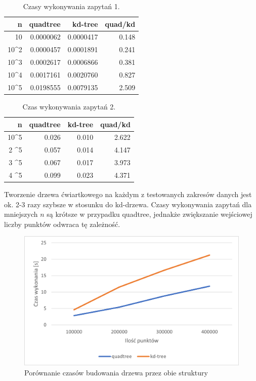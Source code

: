 \documentclass{article}
\begin{document}
\begin{table}[H]
    \centering
    \begin{tabular}{r|rrr}
        n & quadtree & kd-tree & quad/kd \\ \hline
        10 & 0.0000062 & 0.0000417 & 0.148 \\
        10^2 & 0.0000457 & 0.0001891 & 0.241 \\
        10^3 & 0.0002617 & 0.0006866 & 0.381 \\
        10^4 & 0.0017161 & 0.0020760 & 0.827 \\
        10^5 & 0.0198555 & 0.0079135 & 2.509 \\
    \end{tabular}
    \caption{Czasy wykonywania zapytań 1.}
    \label{tab:query1}
\end{table}

\begin{table}[H]
    \centering
    \begin{tabular}{r|rrr}
        n & quadtree & kd-tree & quad/kd \\ \hline
        10^5 & 0.026 & 0.010 & 2.622 \\
        2 \cdot 10^5 & 0.057 & 0.014 & 4.147 \\
        3 \cdot 10^5 & 0.067 & 0.017 & 3.973 \\
        4 \cdot 10^5 & 0.099 & 0.023 & 4.371 \\
    \end{tabular}
    \caption{Czas wykonywania zapytań 2.}
    \label{tab:query2}
\end{table}

Tworzenie drzewa ćwiartkowego na każdym z testowanych zakresów danych jest ok. 2-3 razy szybsze w stosunku do kd-drzewa. Czasy wykonywania zapytań dla mniejszych $n$ są krótsze w przypadku quadtree, jednakże zwiększanie wejściowej liczby punktów odwraca tę zależność.

\begin{figure}[H]
    \centering
    \includegraphics[width=\linewidth]{buildup_chart.png}
    \caption{Porównanie czasów budowania drzewa przez obie struktury}
    \label{fig:buildup_chart}
\end{figure}
\end{document}
